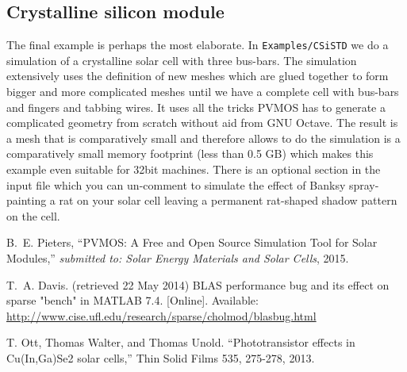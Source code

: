 \documentclass[noshowpacs,preprintnumbers,amsmath,amssymb, letter]{revtex4}
\begin{document}
\subsection{Crystalline silicon module}
The final example is perhaps the most elaborate. In \texttt{Examples/CSiSTD} we do a simulation of a crystalline solar cell with three bus-bars. The simulation extensively uses the definition of new meshes which are glued together to form bigger and more complicated meshes until we have a complete cell with bus-bars and fingers and tabbing wires. It uses all the tricks PVMOS has to generate a complicated geometry from scratch without aid from GNU Octave. The result is a mesh that is comparatively small and therefore allows to do the simulation is a comparatively small memory footprint (less than 0.5 GB) which makes this example even suitable for 32bit machines. There is an optional section in the input file which you can un-comment to simulate the effect of Banksy spray-painting a rat on your solar cell leaving a permanent rat-shaped shadow pattern on the cell. 
\begin{thebibliography}{10}

B.~E. Pieters, ``{PVMOS: A Free and Open Source Simulation Tool for Solar Modules},'' \emph{submitted to: Solar Energy Materials and Solar Cells}, 2015.

T.~A. Davis. (retrieved 22 May 2014) {BLAS performance bug and its effect on
  sparse "bench" in MATLAB 7.4}. [Online]. Available:
  \url{http://www.cise.ufl.edu/research/sparse/cholmod/blasbug.html}

T. Ott, Thomas Walter, and Thomas Unold. ``{Phototransistor effects in Cu(In,Ga)Se2 solar cells},'' Thin Solid Films 535, 275-278, 2013.

\end{thebibliography}
\end{document}
